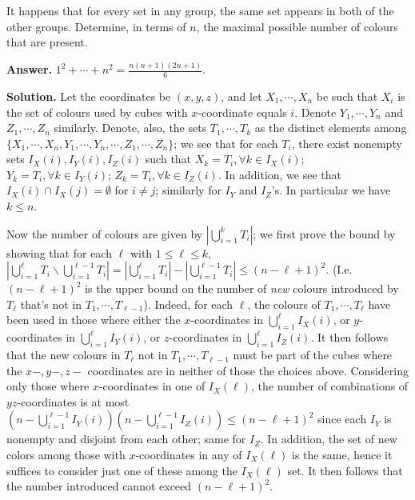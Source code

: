 \documentclass[11pt,a4paper]{article}
\begin{document}
\begin{enumerate}
    It happens that for every set in any group, the same set appears in both of the other groups. Determine, in terms of $n$, the maximal possible number of colours that are present.
    
    \textbf{Answer.} $1^2+\cdots + n^2=\frac{n(n+1)(2n+1)}{6}$. 
    
    \textbf{Solution.} 
    Let the coordinates be $(x, y, z)$, 
    and let $X_1, \cdots, X_n$ be such that $X_i$ is the set of colours used by cubes with $x$-coordinate equals $i$. 
    Denote $Y_1, \cdots, Y_n$ and $Z_1, \cdots, Z_n$ similarly. 
    Denote, also, the sets $T_1, \cdots, T_k$ as the distinct elements among \\
    $\{X_1, \cdots, X_n, Y_1, \cdots, Y_n, \cdots, Z_1, \cdots, Z_n\}$; 
    we see that for each $T_i$, 
    there exist nonempty sets 
    $I_X(i), I_Y(i), I_Z(i)$ such that $X_{k}=T_i, \forall k\in I_X(i)$; 
    $Y_k=T_i, \forall k\in I_Y(i)$; 
    $Z_k=T_i, \forall k\in I_Z(i)$. 
    In addition, we see that $I_X(i)\cap I_X(j)=\emptyset$ for $i\neq j$; 
    similarly for $I_Y$ and $I_Z$'s. 
    In particular we have $k\le n$. 
    
    Now the number of colours are given by $|\bigcup_{i=1}^k T_i|$; 
    we first prove the bound by showing that for each $\ell$ with $1\le \ell\le k$, 
    $|\bigcup_{i=1}^{\ell} T_i \backslash \bigcup_{i=1}^{\ell - 1} T_i | = |\bigcup_{i=1}^{\ell} T_i| - |\bigcup_{i=1}^{\ell - 1} T_i|\le (n-\ell+1)^2$. 
    (I.e. $(n-\ell+1)^2$ is the upper bound on the number of \emph{new} colours introduced by $T_{\ell}$ that's not in $T_1, \cdots, T_{\ell-1}$). 
    Indeed, for each $\ell$, 
    the colours of $T_1, \cdots, T_{\ell}$ have been used in 
    those where either the $x$-coordinates in $\bigcup_{i=1}^{\ell} I_X(i)$, 
    or $y$-coordinates in $\bigcup_{i=1}^{\ell} I_Y(i)$, 
    or $z$-coordinates in $\bigcup_{i=1}^{\ell} I_Z(i)$. 
    It then follows that the new colours in $T_{\ell}$ not in $T_1, \cdots, T_{\ell-1}$ must be part of 
    the cubes where the $x-, y-, z-$ coordinates are in neither of those the choices above. 
    Considering only those where $x$-coordinates in one of $I_X(\ell)$, 
    the number of combinations of $yz$-coordinates is at most 
    $(n - \bigcup_{i=1}^{\ell-1} I_Y(i))(n - \bigcup_{i=1}^{\ell-1} I_Z(i))
    \le(n-\ell+1)^2$ since each $I_Y$ is nonempty and disjoint from each other; 
    same for $I_Z$. 
    In addition, the set of new colors among those with $x$-coordinates in any of $I_X(\ell)$ is the same, 
    hence it suffices to consider just one of these among the $I_X(\ell)$ set. 
    It then follows that the number introduced cannot exceed $(n-\ell+1)^2$. 
    

\end{enumerate}
\end{document}
